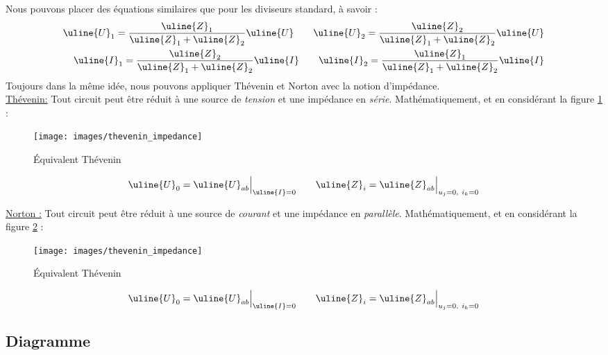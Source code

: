 \documentclass[12pt,a4paper]{article}
\newcommand{\uz}{\uline{Z} }
\newcommand{\ui}{\uline{I} }
\newcommand{\uu}{\uline{U} }
\begin{document}
Nous pouvons placer des équations similaires que pour les diviseurs standard, à savoir :
	\begin{align}
	\uu_1 = \frac{\uz_1}{\uz_1 + \uz_2}\uu \qquad \uu_2 = \frac{\uz_2}{\uz_1 + \uz_2}\uu\\
	\ui_1 = \frac{\uz_2}{\uz_1 + \uz_2}\ui \qquad \ui_2 = \frac{\uz_1}{\uz_1 + \uz_2}\ui
	\end{align}
 Toujours dans la même idée, nous pouvons appliquer Thévenin et Norton avec la notion d'impédance. \\

\uline{Thévenin:} Tout circuit peut être réduit à une source de \textit{tension} et une impédance en \textit{série}. Mathématiquement, et en considérant la figure \ref{fig: thevenin impedance} :
\begin{figure}[!h]
	\centering
	\texttt{[image: images/thevenin\_impedance]}
	\caption{Équivalent Thévenin}
	\label{fig: thevenin impedance}
\end{figure}

\begin{equation}
	\uu_0 = \uu_{ab}\Big|_{\ui = 0} \qquad \uz_i = \uz_{ab}\Big|_{u_j = 0,\ i_k = 0}
\end{equation}

\uline{Norton :} Tout circuit peut être réduit à une source de \textit{courant} et une impédance en \textit{parallèle}. Mathématiquement, et en considérant la figure \ref{fig: norton impedance} :
\begin{figure}[!h]
	\centering
	\texttt{[image: images/thevenin\_impedance]}
	\caption{Équivalent Thévenin}
	\label{fig: norton impedance}
\end{figure}
\begin{equation}
	\uu_0 = \uu_{ab}\Big|_{\ui = 0} \qquad \uz_i = \uz_{ab}\Big|_{u_j = 0,\ i_k = 0}
\end{equation}


\subsection{Diagramme}
\end{document}
